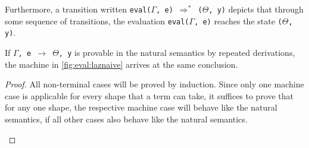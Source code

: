 Furthermore, a transition written \texttt{eval($\Gamma$, e) $\Rightarrow^*$ ($\Theta$, y)} depicts that through some sequence of transitions, the evaluation \texttt{eval($\Gamma$, e)} reaches the state \texttt{($\Theta$, y)}.
\begin{theorem}
	\label{theorem:conclusion}
	If \texttt{$\Gamma$, e $\rightarrow$ $\Theta$, y} is provable in the natural semantics by repeated derivations, the machine in \autoref{fig:eval:laznaive} arrives at the same conclusion.
\end{theorem}
\begin{proof}
	All non-terminal cases will be proved by induction.
	Since only one machine case is applicable for every shape that a term can take, it suffices to prove that for any one shape, the respective machine case will behave like the natural semantics, if all other cases also behave like the natural semantics.
	\begin{pcases}
\end{pcases}
\end{proof}
